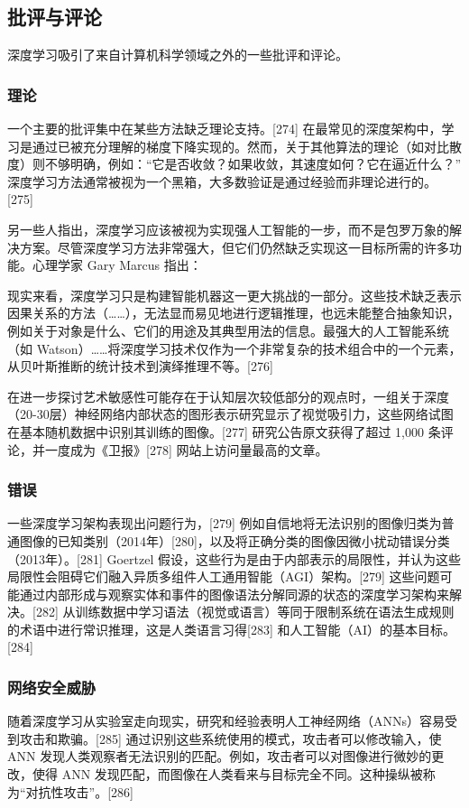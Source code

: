 \subsection{批评与评论}  
深度学习吸引了来自计算机科学领域之外的一些批评和评论。
\subsubsection{理论} 
一个主要的批评集中在某些方法缺乏理论支持。[274] 在最常见的深度架构中，学习是通过已被充分理解的梯度下降实现的。然而，关于其他算法的理论（如对比散度）则不够明确，例如：“它是否收敛？如果收敛，其速度如何？它在逼近什么？” 深度学习方法通常被视为一个黑箱，大多数验证是通过经验而非理论进行的。[275]  

另一些人指出，深度学习应该被视为实现强人工智能的一步，而不是包罗万象的解决方案。尽管深度学习方法非常强大，但它们仍然缺乏实现这一目标所需的许多功能。心理学家 Gary Marcus 指出：  

现实来看，深度学习只是构建智能机器这一更大挑战的一部分。这些技术缺乏表示因果关系的方法（……），无法显而易见地进行逻辑推理，也远未能整合抽象知识，例如关于对象是什么、它们的用途及其典型用法的信息。最强大的人工智能系统（如 Watson）……将深度学习技术仅作为一个非常复杂的技术组合中的一个元素，从贝叶斯推断的统计技术到演绎推理不等。[276]  

在进一步探讨艺术敏感性可能存在于认知层次较低部分的观点时，一组关于深度（20-30层）神经网络内部状态的图形表示研究显示了视觉吸引力，这些网络试图在基本随机数据中识别其训练的图像。[277] 研究公告原文获得了超过 1,000 条评论，并一度成为《卫报》[278] 网站上访问量最高的文章。  
\subsubsection{错误}  
一些深度学习架构表现出问题行为，[279] 例如自信地将无法识别的图像归类为普通图像的已知类别（2014年）[280]，以及将正确分类的图像因微小扰动错误分类（2013年）。[281] Goertzel 假设，这些行为是由于内部表示的局限性，并认为这些局限性会阻碍它们融入异质多组件人工通用智能（AGI）架构。[279] 这些问题可能通过内部形成与观察实体和事件的图像语法分解同源的状态的深度学习架构来解决。[282] 从训练数据中学习语法（视觉或语言）等同于限制系统在语法生成规则的术语中进行常识推理，这是人类语言习得[283] 和人工智能（AI）的基本目标。[284]  
\subsubsection{网络安全威胁}  
随着深度学习从实验室走向现实，研究和经验表明人工神经网络（ANNs）容易受到攻击和欺骗。[285] 通过识别这些系统使用的模式，攻击者可以修改输入，使 ANN 发现人类观察者无法识别的匹配。例如，攻击者可以对图像进行微妙的更改，使得 ANN 发现匹配，而图像在人类看来与目标完全不同。这种操纵被称为“对抗性攻击”。[286]  

